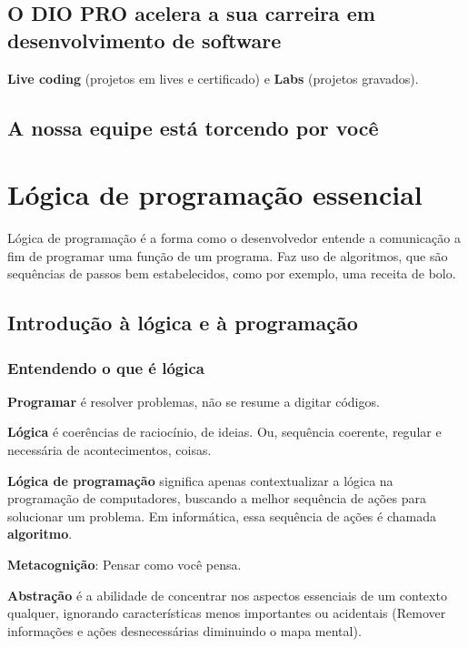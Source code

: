 \documentclass[12pt,a4paper]{article}
\begin{document}
	\subsection{O DIO PRO acelera a sua carreira em desenvolvimento de software}
	
	\textbf{Live coding} (projetos em lives e certificado) e \textbf{Labs} (projetos gravados).
	
	\subsection{A nossa equipe está torcendo por você}
	
	\section{Lógica de programação essencial}
	
	Lógica de programação é a forma como o desenvolvedor entende a comunicação a fim de programar uma função de um programa. Faz uso de algoritmos, que são sequências de passos bem estabelecidos, como por exemplo, uma receita de bolo.
	
	\subsection{Introdução à lógica e à programação}
	
	\subsubsection{Entendendo o que é lógica}
	
	\textbf{Programar} é resolver problemas, não se resume a digitar códigos.
	
	\textbf{Lógica} é coerências de raciocínio, de ideias. Ou, sequência coerente, regular e necessária de acontecimentos, coisas.
	
	\textbf{Lógica de programação} significa apenas contextualizar a lógica na programação de computadores, buscando a melhor sequência de ações para solucionar um problema. Em informática, essa sequência de ações é chamada \textbf{algoritmo}.
	
	\textbf{Metacognição}: Pensar como você pensa.
	
	\textbf{Abstração} é a abilidade de concentrar nos aspectos essenciais de um contexto qualquer, ignorando características menos importantes ou acidentais (Remover informações e ações desnecessárias diminuindo o mapa mental).
	
\end{document}
